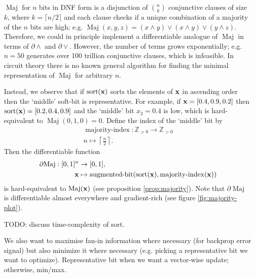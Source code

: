 \documentclass{article} %
\begin{document}
$\operatorname{Maj}$ for $n$ bits in DNF form is a disjunction of $\binom{n}{k}$ conjunctive clauses of size $k$, where $k=\lceil n/2 \rceil$ and each clause checks if a unique combination of a majority of the $n$ bits are high; e.g. $\operatorname{Maj}(x, y, z) = (x \wedge y) \vee (x \wedge y) \vee (y \wedge z)$. Therefore, we could in principle implement a differentiable analogue of $\operatorname{Maj}$ in terms of $\partial\wedge$ and $\partial\vee$. However, the number of terms grows exponentially; e.g. $n=50$ generates over 100 trillion conjunctive clauses, which is infeasible. In circuit theory there is no known general algorithm for finding the minimal representation of $\operatorname{Maj}$ for arbitrary $n$.

Instead, we observe that if $\operatorname{sort}({\bf x})$ sorts the elements of ${\bf x}$ in ascending order then the `middle' soft-bit is representative. For example, if ${\bf x} = [0.4, 0.9, 0.2]$ then $\operatorname{sort}({\bf x}) = [0.2, 0.4, 0.9]$ and the `middle' bit $x_{2}=0.4$ is low, which is hard-equivalent to $\operatorname{Maj}(0, 1, 0) = 0$. Define the index of the `middle' bit by
\begin{equation*}
\begin{aligned}
\operatorname{majority-index}: \mathbb{Z}_{>0} \to \mathbb{Z}_{> 0}\\
n \mapsto \left\lceil \frac{n}{2}\right\rceil
\text{.}
\end{aligned}
\end{equation*}
Then the differentiable function
\begin{equation*}
\begin{aligned}
	\partial\!\operatorname{Maj}: [0,1]^{n} &\to [0,1], \\
	{\bf x} &\mapsto \operatorname{augmented-bit}(\operatorname{sort}({\bf x}), \operatorname{majority-index}({\bf x}))
\end{aligned}
\end{equation*}
is hard-equivalent to $\operatorname{Maj}({\bf x})$ (see proposition \ref{prop:majority}). Note that $\partial\!\operatorname{Maj}$ is differentiable almost everywhere and gradient-rich (see figure \ref{fig:majority-plot}).


TODO: discuss time-complexity of sort.

We also want to maximise fan-in information where necessary (for backprop error signal) but also minimize it where necessary (e.g. picking a representative bit we want to optimize). Representative bit when we want a vector-wise update; otherwise, min/max.
\end{document}

